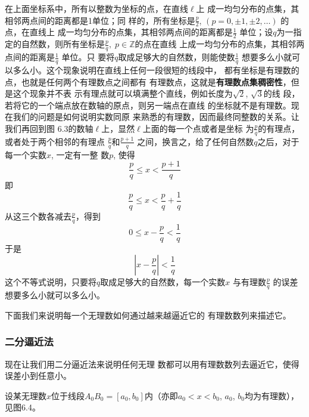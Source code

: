 \begin{figure}[htp]
    \centering
{}
    \caption{}
\end{figure}

在上面坐标系中，所有以整数为坐标的点，在直线$\ell$上
成一均匀分布的点集，其相邻两点间的距离都是1单位；同
样的，所有坐标是$\frac{p}{2}$, $(p=0,\pm1,\pm2,\ldots)$
的点，在直线上
成一均匀分布的点集，其相邻两点间的距离都是$\frac{1}{2}$
单位；设$q$为一指定的自然数，则所有坐标是$\frac{p}{q},\; p\in\mathbb{Z}$的点在直线
上成一均匀分布的点集，其相邻两点间的距离是$\frac{1}{q}$
单位。只
要将$q$取成足够大的自然数，则能使数$\frac{1}{q}$
想要多么小就可
以多么小。这个现象说明在直线上任何一段很短的线段中，
都有坐标是有理数的点，也就是任何两个有理数点之间都有
有理数点，这就是\textbf{有理数点集稠密性}，但是这个现象并不表
示有理点就可以填满整个直线，例如长度为$\sqrt{2}$, $\sqrt{3}$的线
段，若将它的一个端点放在数轴的原点，则另一端点在直线
的坐标就不是有理数。现在我们的问题是如何说明实数同原
来熟悉的有理数，因而最终同整数的关系。让我们再回到图
6.3的数轴$\ell$上，显然$\ell$上面的每一个点或者是坐标
为$\frac{p}{q}$的有理点，或者处于两个相邻的有理点
$\frac{p}{q}$和$\frac{p+1}{q}$
之间，换言之，给了任何自然数$q$之后，对于每一个实数$x$, 一定有一整
数$p$, 使得
\[\frac{p}{q}\le x<\frac{p+1}{q}\]
即
\[\frac{p}{q}\le x<\frac{p}{q}+\frac{1}{q}\]
从这三个数各减去$\frac{p}{q}$，得到
\[0\le x-\frac{p}{q}<\frac{1}{q}\]
于是
\[\left|x-\frac{p}{q}\right|<\frac{1}{q}\]
这个不等式说明，只要将$q$取成足够大的自然数，每一个实数$x$
与有理数$\frac{p}{q}$
的误差想要多么小就可以多么小。

下面我们来说明每一个无理数如何通过越来越逼近它的
有理数数列来描述它。

\subsubsection{二分逼近法}

现在让我们用二分逼近法来说明任何无理
数都可以用有理数数列去逼近它，使得误差小到任意小。

设某无理数$x$位于线段$A_0B_0=[a_0,b_0]$内（亦即$a_0<x<b_0$,
$a_0$, $b_0$均为有理数），见图6.4。

